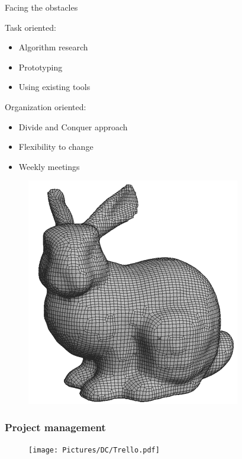 \begin{frame}{Facing the obstacles}
\begin{minipage}{1\linewidth}
\begin{multicols}{2}
Task oriented:
\begin{itemize}
\item Algorithm research 
\item Prototyping
\item Using existing tools
\end{itemize}
\columnbreak
Organization oriented:
\begin{itemize}
\item Divide and Conquer approach
\item Flexibility to change
\item Weekly meetings
\end{itemize}
\end{multicols}
\end{minipage}

\begin{minipage}{1\linewidth}
\hspace{5 mm}
\begin{figure}
	\includegraphics[scale=0.35]{Pictures/FirstHalf/sf_bunny.png}
\end{figure}
\end{minipage}

\end{frame}


\begin{frame}

	\frametitle{Project management}

	\begin{figure}
	\texttt{[image: Pictures/DC/Trello.pdf]}
	\end{figure}
	
\end{frame}


